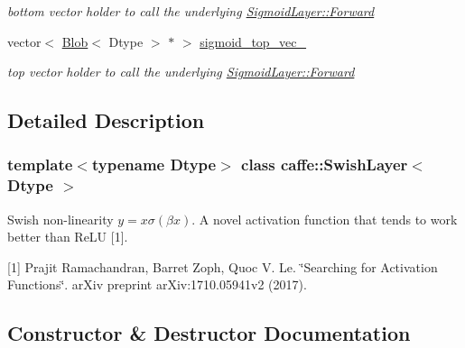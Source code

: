 \begin{DoxyCompactItemize}
\begin{DoxyCompactList}\small\item\em bottom vector holder to call the underlying \mbox{\hyperlink{classcaffe_1_1_layer_ab57d272dabe8c709d2a785eebe72ca57}{Sigmoid\+Layer\+::\+Forward}} \end{DoxyCompactList}\item 
\mbox{\label{classcaffe_1_1_swish_layer_a7135f11a76498b41b0fffa0cf025cf99}} 
vector$<$ \mbox{\hyperlink{classcaffe_1_1_blob}{Blob}}$<$ Dtype $>$ $\ast$ $>$ \mbox{\hyperlink{classcaffe_1_1_swish_layer_a7135f11a76498b41b0fffa0cf025cf99}{sigmoid\+\_\+top\+\_\+vec\+\_\+}}
\begin{DoxyCompactList}\small\item\em top vector holder to call the underlying \mbox{\hyperlink{classcaffe_1_1_layer_ab57d272dabe8c709d2a785eebe72ca57}{Sigmoid\+Layer\+::\+Forward}} \end{DoxyCompactList}\end{DoxyCompactItemize}


\subsection{Detailed Description}
\subsubsection*{template$<$typename Dtype$>$\newline
class caffe\+::\+Swish\+Layer$<$ Dtype $>$}

Swish non-\/linearity $ y = x \sigma (\beta x) $. A novel activation function that tends to work better than Re\+LU \mbox{[}1\mbox{]}. 

\mbox{[}1\mbox{]} Prajit Ramachandran, Barret Zoph, Quoc V. Le. \char`\"{}\+Searching for
    Activation Functions\char`\"{}. ar\+Xiv preprint ar\+Xiv\+:1710.\+05941v2 (2017). 

\subsection{Constructor \& Destructor Documentation}
\mbox{\label{classcaffe_1_1_swish_layer_afd59cd91314ef60acef0d3ba80500818}} 
